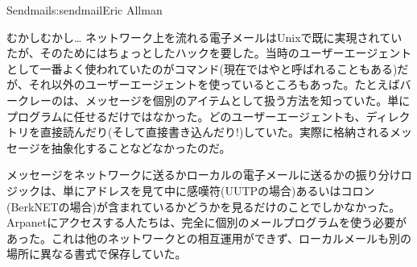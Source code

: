 \begin{aosachapter}{Sendmail}{s:sendmail}{Eric Allman}
\begin{aosasect1}{むかしむかし\ldots}
ネットワーク上を流れる電子メールはUnixで既に実現されていたが、そのためにはちょっとしたハックを要した。当時のユーザーエージェントとして一番よく使われていたのがコマンド(現在ではやと呼ばれることもある)だが、それ以外のユーザーエージェントを使っているところもあった。たとえばバークレーのは、メッセージを個別のアイテムとして扱う方法を知っていた。単にプログラムに任せるだけではなかった。どのユーザーエージェントも、ディレクトリを直接読んだり(そして直接書き込んだり!)していた。実際に格納されるメッセージを抽象化することなどなかったのだ。

メッセージをネットワークに送るかローカルの電子メールに送るかの振り分けロジックは、単にアドレスを見て中に感嘆符(UUTPの場合)あるいはコロン(BerkNETの場合)が含まれているかどうかを見るだけのことでしかなかった。Arpanetにアクセスする人たちは、完全に個別のメールプログラムを使う必要があった。これは他のネットワークとの相互運用ができず、ローカルメールも別の場所に異なる書式で保存していた。


\end{aosasect1}
\end{aosachapter}
